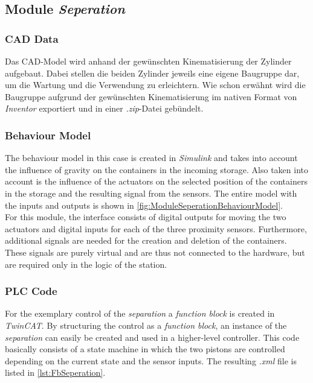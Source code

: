     
\subsection{Module \textit{Seperation}}
\subsubsection{CAD Data}
Das CAD-Model wird anhand der gewünschten Kinematisierung der Zylinder aufgebaut. Dabei stellen die beiden Zylinder jeweils eine eigene Baugruppe dar, um die Wartung und die Verwendung zu erleichtern. Wie schon erwähnt wird die Baugruppe aufgrund der gewünschten Kinematisierung im nativen Format von \textit{Inventor} exportiert und in einer \textit{.zip}-Datei gebündelt. 

    
\subsubsection{Behaviour Model}
    The behaviour model in this case is created in \textit{Simulink} and takes into account the influence of gravity on the containers in the incoming storage. Also taken into account is the influence of the actuators on the selected position of the containers in the storage and the resulting signal from the sensors. The entire model with the inputs and outputs is shown in \autoref{fig:ModuleSeperationBehaviourModel}.  \\
    
    For this module, the interface consists of digital outputs for moving the two actuators and digital inputs for each of the three proximity sensors. Furthermore, additional signals are needed for the creation and deletion of the containers. These signals are purely virtual and are thus not connected to the hardware, but are required only in the logic of the station.\\

	


\subsubsection{PLC Code}
    For the exemplary control of the \textit{separation} a \textit{function block} is created in \textit{TwinCAT}. By structuring the control as a \textit{function block}, an instance of the \textit{separation} can easily be created and used in a higher-level controller. This code basically consists of a state machine in which the two pistons are controlled depending on the current state and the sensor inputs. The resulting \textit{.xml} file is listed in \autoref{lst:FbSeperation}. 

